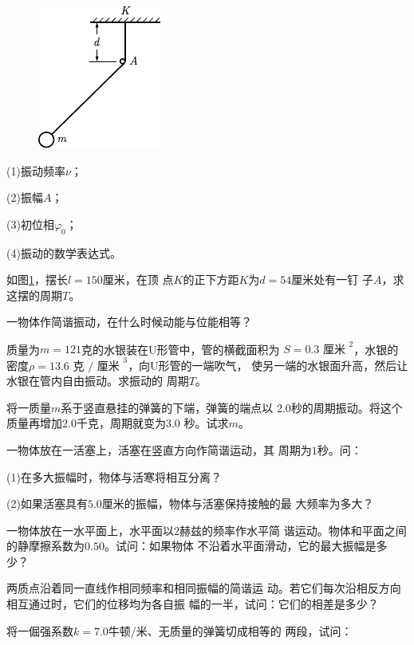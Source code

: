 \begin{exercises}
\begin{figure}
    \vspace{-1.56em}
    \centering
    \includegraphics{figure/fig07.15}
    \caption{}
    \label{fig:07.15}
\end{figure}
(1)振动频率$ \nu $；

(2)振幅$ A $；

(3)初位相$ \varphi _ { 0 } $；

(4)振动的数学表达式。

\exercise 如图\ref{fig:07.15}，摆长$ l = 150 $厘米，在顶
点$ K $的正下方距$ K $为$ d = 54 $厘米处有一钉
子$ A $，求这摆的周期$ T $。

\exercise 一物体作简谐振动，在什么时候动能与位能相等？

\exercise 质量为$ m = 121 $克的水银装在U形管中，管的横截面积为
$ S = 0.3 \text { 厘米 } ^ { 2 }$，水银的密度$ \rho = 13.6 \text { 克 } / \text { 厘米 } ^ { 3 }$，向U形管的一端吹气，
使另一端的水银面升高，然后让水银在管内自由振动。求振动的
周期$ T $。

\exercise 将一质量$ m $系于竖直悬挂的弹簧的下端，弹簧的端点以
$ 2.0 $秒的周期振动。将这个质量再增加$ 2.0 $千克，周期就变为$ 3.0 $
秒。试求$ m $。

\exercise 一物体放在一活塞上，活塞在竖直方向作简谐运动，其
周期为$ 1 $秒。问：

(1)在多大振幅时，物体与活寒将相互分离？

(2)如果活塞具有$ 5.0 $厘米的振幅，物体与活塞保持接触的最
大频率为多大？

\exercise 一物体放在一水平面上，水平面以$ 2 $赫兹的频率作水平简
谐运动。物体和平面之间的静摩擦系数为$ 0.50 $。试问：如果物体
不沿着水平面滑动，它的最大振幅是多少？

\exercise 两质点沿着同一直线作相同频率和相同振幅的简谐运
动。若它们每次沿相反方向相互通过时，它们的位移均为各自振
幅的一半，试问：它们的相差是多少？

\exercise 将一倔强系数$ k = 7.0 $牛顿/米、无质量的弹簧切成相等的
两段，试问：


\end{exercises}
